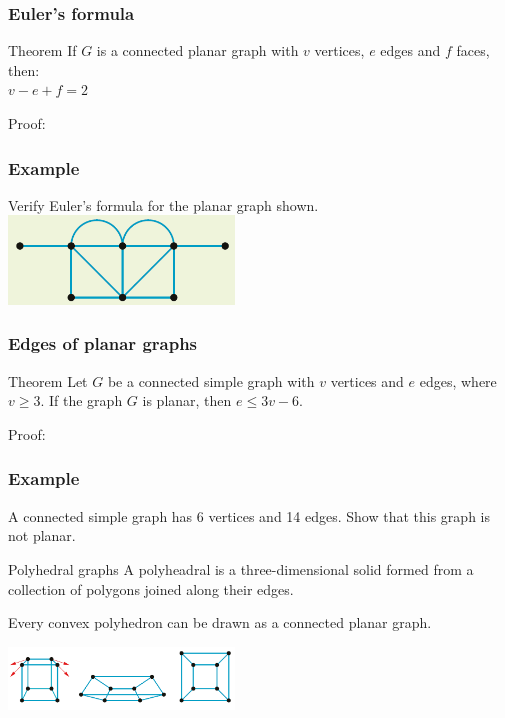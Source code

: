 \documentclass[
	11pt, %
]{beamer}
\begin{document}
\begin{frame}[t]
    \frametitle{Euler's formula}
    \begin{block}{Theorem}
        If $G$ is a connected planar graph with $v$ vertices, $e$ edges and $f$ faces, then:\\
    $v-e+f=2$
    \end{block}
    Proof:
\end{frame}
\begin{frame}
\end{frame}


\begin{frame}[t]
    \frametitle{Example}
    Verify Euler’s formula for the planar graph shown.
    \includegraphics[width=6cm]{Graph16.png}
\end{frame}

\begin{frame}[t]
    \frametitle{Edges of planar graphs}
    \begin{block}{Theorem}
        Let $G$ be a connected simple graph with $v$ vertices and $e$ edges, where $v \geq 3$. If the
        graph $G$ is planar, then $e \leq 3v - 6$.
    \end{block}
    Proof:
\end{frame}
\begin{frame}
\end{frame}

\begin{frame}[t]
    \frametitle{Example}
    A connected simple graph has 6 vertices and 14 edges. Show that this graph is not planar.
\end{frame}

\begin{frame}{Polyhedral graphs}
    A polyheadral is a three-dimensional solid formed from a collection of polygons joined along their edges.\\
    \begin{block}{}
        Every convex polyhedron can be drawn as a connected planar graph.
    \end{block}
    \begin{center}
        \includegraphics[width=6cm]{Poly1.png}
    \end{center}
\end{frame}
\end{document}
